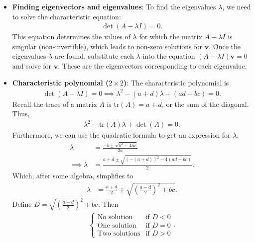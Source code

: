 \documentclass{report}
\begin{document}
\begin{itemize}
        \item \textbf{Finding eigenvectors and eigenvalues}: To find the eigenvalues $\lambda$, we need to solve the characteristic equation:
            \begin{align*}
                \det(A - \lambda I) =0
            .\end{align*}
            \bigbreak \noindent 
            This equation determines the values of $\lambda$ for which the matrix $A-\lambda I$ is singular (non-invertible), which leads to non-zero solutions for $\mathbf{v}$.
            \bigbreak \noindent 
            Once the eigenvalues $\lambda$ are found, substitute each $\lambda$ into the equation $(A-\lambda I)\mathbf{v}=0$ and solve for $\mathbf{v}$. These are the eigenvectors corresponding to each eigenvalue.
        \item \textbf{Characteristic polynomial ($2\times 2$)}: The characteristic polynomial is
            \begin{align*}
                \det(A - \lambda I) =  0 \implies \lambda^{2} - (a+d)\lambda + (ad-bc) = 0
            .\end{align*}
            Recall the trace of a matrix $A$ is $\text{tr}(A)  = a + d$, or the sum of the diagonal. Thus,
            \begin{align*}
                \lambda^{2} - \text{tr}(A)\lambda + \det(A) = 0
            .\end{align*}
            Furthermore, we can use the quadratic formula to get an expression for $\lambda$.
            \begin{align*}
                \lambda &= \frac{-b \pm \sqrt{b^{2}-4ac}}{2a} \\
                \implies \lambda&= \frac{a+d \pm \sqrt{(-(a+d))^{2} -4(ad-bc)}}{2}
            .\end{align*}
            Which, after some algebra, simplifies to
            \begin{align*}
                \lambda &= \frac{a+d}{2} \pm \sqrt{\left(\frac{a-d}{2}\right)^{2} + bc}
            .\end{align*}
            \bigbreak \noindent 
            Define $D  = \sqrt{\left(\frac{a+d}{2}\right)^{2} + bc}$. Then
            \begin{align*}
                \begin{cases}
                    \text{No solution}    & \text{if } D < 0  \\
                    \text{One solution}    & \text{if } D = 0  \\
                    \text{Two solutions}    & \text{if } D > 0  
                \end{cases}
            .\end{align*}


            

    \end{itemize}
\end{document}
